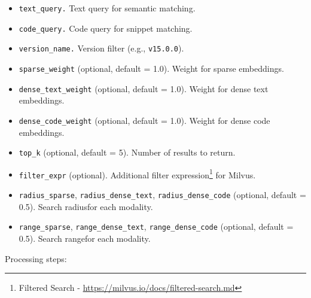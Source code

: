 \begin{itemize}
	\item \texttt{text\_query.} Text query for semantic matching.
	\item \texttt{code\_query.} Code query for snippet matching.
	\item \texttt{version\_name.} Version filter (e.g., \texttt{v15.0.0}).
	\item \texttt{sparse\_weight} (optional, default = 1.0). Weight for sparse embeddings.
	\item \texttt{dense\_text\_weight} (optional, default = 1.0). Weight for dense text embeddings.
	\item \texttt{dense\_code\_weight} (optional, default = 1.0). Weight for dense code embeddings.
	\item \texttt{top\_k} (optional, default = 5). Number of results to return.
	\item \texttt{filter\_expr} (optional). Additional filter expression\footnote{Filtered Search - \url{https://milvus.io/docs/filtered-search.md}} for Milvus.
	\item \texttt{radius\_sparse}, \texttt{radius\_dense\_text}, \texttt{radius\_dense\_code} (optional, default = 0.5). Search radius\protect\footnotemark \space for each modality.
   	\item \texttt{range\_sparse}, \texttt{range\_dense\_text}, \texttt{range\_dense\_code} (optional, default = 0.5). Search range\protect\footnotemark \space for each modality.
\end{itemize}


Processing steps:

